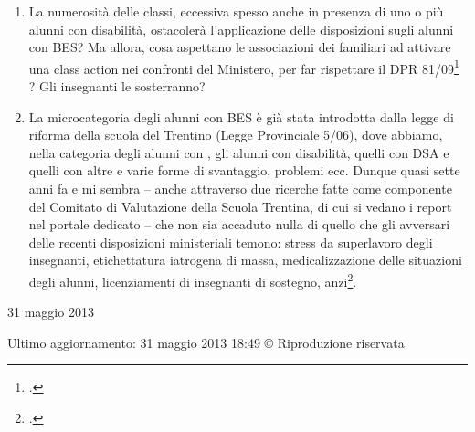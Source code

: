\begin{enumerate}
	Questo è un punto ancora debole, per ovvi motivi strutturali, di possibilità di funzionamento, e di complessità del compito. Questo terzo livello di “intelligenza” auspicato, dopo quello del Consiglio di Classe e del  , chiede ulteriore elaborazione, ma ricordo che questa dimensione – inter istituzionale e territoriale – mostrava anche in altre proposte o disposizioni evidenti debolezze (si veda ad esempio la seconda parte dell'intesa Stato-Regioni del 20 marzo 2008\footcite{ra_39_2008} e la proposta dei CRI, i Centri Risorse per l'Integrazione Scolastica, del Rapporto Caritas, Treellle e Fondazione Agnelli del 2011).
	\item La numerosità delle classi, eccessiva spesso anche in presenza di uno o più alunni con disabilità, ostacolerà l'applicazione delle disposizioni sugli alunni con BES? Ma allora, cosa aspettano le associazioni dei familiari ad attivare una class action nei confronti del Ministero, per far rispettare il DPR 81/09\footcite{DPR_81_2009} ? Gli insegnanti le sosterranno?
	\item La microcategoria degli alunni con BES è già stata introdotta dalla legge di riforma della scuola del Trentino (Legge Provinciale 5/06), dove abbiamo, nella categoria degli alunni con , gli alunni con disabilità, quelli con DSA e quelli con altre e varie forme di svantaggio, problemi ecc. Dunque quasi sette anni fa e mi sembra – anche attraverso due ricerche fatte come componente del Comitato di Valutazione della Scuola Trentina, di cui si vedano i report nel portale dedicato – che non sia accaduto nulla di quello che gli avversari delle recenti disposizioni ministeriali temono: stress da superlavoro degli insegnanti, etichettatura iatrogena di massa, medicalizzazione delle situazioni degli alunni, licenziamenti di insegnanti di sostegno, anzi\footcite{ianes1}.
\end{enumerate}



 
31 maggio 2013

Ultimo aggiornamento: 31 maggio 2013 18:49
© Riproduzione riservata
 
 
